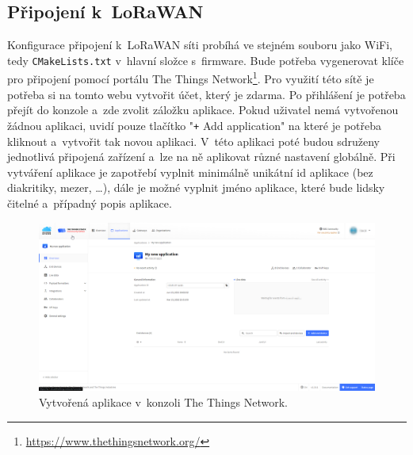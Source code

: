 \subsection{Připojení k~LoRaWAN}

Konfigurace připojení k~LoRaWAN síti probíhá ve stejném souboru jako WiFi, tedy \texttt{CMakeLists.txt} v~hlavní složce s~firmware. Bude potřeba vygenerovat klíče pro připojení pomocí portálu The Things Network\footnote{\url{https://www.thethingsnetwork.org/}}. Pro využití této sítě je potřeba si na tomto webu vytvořit účet, který je zdarma. Po přihlášení je potřeba přejít do konzole a~zde zvolit záložku aplikace. Pokud uživatel nemá vytvořenou žádnou aplikaci, uvidí pouze tlačítko "\texttt{+} Add application"{} na které je potřeba kliknout a~vytvořit tak novou aplikaci. V~této aplikaci poté budou sdruženy jednotlivá připojená zařízení a~lze na ně aplikovat různé nastavení globálně. Při vytváření aplikace je zapotřebí vyplnit minimálně unikátní id aplikace (bez diakritiky, mezer, \dots), dále je možné vyplnit jméno aplikace, které bude lidsky čitelné a~případný popis aplikace.

\begin{figure}[h]
    \centering
    \includegraphics[width=\textwidth]{obrazky/ttnApps.png}
    \caption{Vytvořená aplikace v~konzoli The Things Network.}
    \label{fig_TTNApp}
\end{figure}

